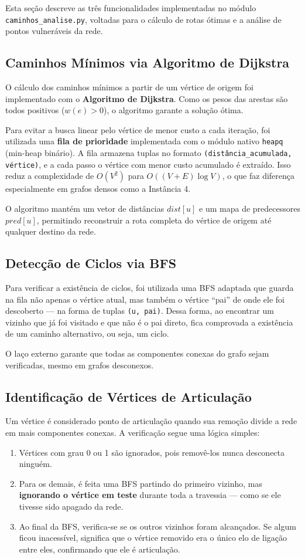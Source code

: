 \documentclass[12pt,a4paper]{article}
\begin{document}
Esta seção descreve as três funcionalidades implementadas no módulo \texttt{caminhos\_analise.py}, voltadas para o cálculo de rotas ótimas e a análise de pontos vulneráveis da rede.

\subsection{Caminhos Mínimos via Algoritmo de Dijkstra}
O cálculo dos caminhos mínimos a partir de um vértice de origem foi implementado com o \textbf{Algoritmo de Dijkstra}. Como os pesos das arestas são todos positivos ($w(e) > 0$), o algoritmo garante a solução ótima.

Para evitar a busca linear pelo vértice de menor custo a cada iteração, foi utilizada uma \textbf{fila de prioridade} implementada com o módulo nativo \texttt{heapq} (min-heap binário). A fila armazena tuplas no formato \texttt{(distância\_acumulada, vértice)}, e a cada passo o vértice com menor custo acumulado é extraído. Isso reduz a complexidade de $O(V^2)$ para $O((V + E) \log V)$, o que faz diferença especialmente em grafos densos como a Instância 4.

O algoritmo mantém um vetor de distâncias $dist[u]$ e um mapa de predecessores $pred[u]$, permitindo reconstruir a rota completa do vértice de origem até qualquer destino da rede.

\subsection{Detecção de Ciclos via BFS}
Para verificar a existência de ciclos, foi utilizada uma BFS adaptada que guarda na fila não apenas o vértice atual, mas também o vértice ``pai'' de onde ele foi descoberto --- na forma de tuplas \texttt{(u, pai)}. Dessa forma, ao encontrar um vizinho que já foi visitado e que não é o pai direto, fica comprovada a existência de um caminho alternativo, ou seja, um ciclo.

O laço externo garante que todas as componentes conexas do grafo sejam verificadas, mesmo em grafos desconexos.

\subsection{Identificação de Vértices de Articulação}
Um vértice é considerado ponto de articulação quando sua remoção divide a rede em mais componentes conexas. A verificação segue uma lógica simples:
\begin{enumerate}
    \item Vértices com grau 0 ou 1 são ignorados, pois removê-los nunca desconecta ninguém.
    \item Para os demais, é feita uma BFS partindo do primeiro vizinho, mas \textbf{ignorando o vértice em teste} durante toda a travessia --- como se ele tivesse sido apagado da rede.
    \item Ao final da BFS, verifica-se se os outros vizinhos foram alcançados. Se algum ficou inacessível, significa que o vértice removido era o único elo de ligação entre eles, confirmando que ele é articulação.
\end{enumerate}
\end{document}
